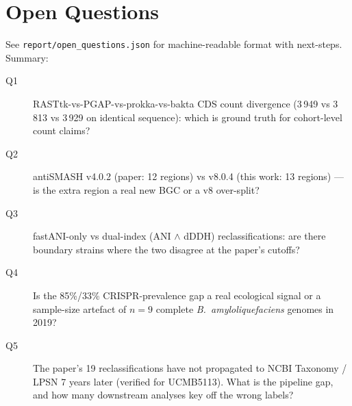 \documentclass[11pt]{article}
\begin{document}
\section{Open Questions}
See \texttt{report/open\_questions.json} for machine-readable format with next-steps. Summary:
\begin{description}
\item[Q1] RASTtk-vs-PGAP-vs-prokka-vs-bakta CDS count divergence (3\,949 vs 3\,813 vs 3\,929 on identical sequence): which is ground truth for cohort-level count claims?
\item[Q2] antiSMASH v4.0.2 (paper: 12 regions) vs v8.0.4 (this work: 13 regions) --- is the extra region a real new BGC or a v8 over-split?
\item[Q3] fastANI-only vs dual-index (ANI $\wedge$ dDDH) reclassifications: are there boundary strains where the two disagree at the paper's cutoffs?
\item[Q4] Is the 85\%/33\% CRISPR-prevalence gap a real ecological signal or a sample-size artefact of $n{=}9$ complete \textit{B.\ amyloliquefaciens} genomes in 2019?
\item[Q5] The paper's 19 reclassifications have not propagated to NCBI Taxonomy / LPSN 7 years later (verified for UCMB5113). What is the pipeline gap, and how many downstream analyses key off the wrong labels?
\end{description}
\end{document}
